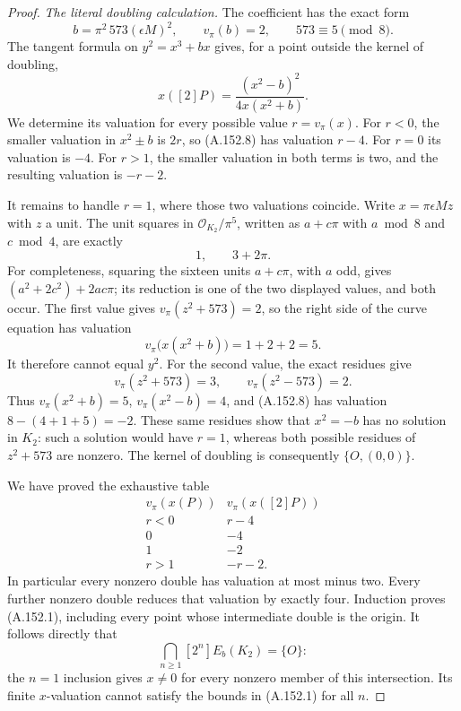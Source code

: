 \begin{proof}
\emph{The literal doubling calculation.}
The coefficient has the exact form
\[
             b=\pi^2\,573(\epsilon M)^2,
             \qquad v_\pi(b)=2,\qquad 573\equiv5\pmod8.
\tag{A.152.7}
\]
The tangent formula on \(y^2=x^3+bx\) gives, for a point
outside the kernel of doubling,
\[
                   x([2]P)=\frac{(x^2-b)^2}{4x(x^2+b)}.
\tag{A.152.8}
\]
We determine its valuation for every possible value
\(r=v_\pi(x)\).
For \(r<0\), the smaller valuation in \(x^2\pm b\)
is \(2r\), so (A.152.8) has valuation \(r-4\).
For \(r=0\) its valuation is \(-4\).
For \(r>1\), the smaller valuation in both terms is two,
and the resulting valuation is \(-r-2\).

It remains to handle \(r=1\), where those two valuations
coincide.  Write \(x=\pi\epsilon Mz\) with \(z\) a unit.
The unit squares in
\(\mathcal O_{K_2}/\pi^5\), written as
\(a+c\pi\) with \(a\bmod8\) and \(c\bmod4\), are
exactly
\[
                                1,\qquad3+2\pi.
\tag{A.152.9}
\]
For completeness, squaring the sixteen units
\(a+c\pi\), with \(a\) odd, gives
\((a^2+2c^2)+2ac\pi\); its reduction is one of the two
displayed values, and both occur.
The first value gives
\(v_\pi(z^2+573)=2\), so the right side of the curve
equation has valuation
\[
              v_\pi\bigl(x(x^2+b)\bigr)=1+2+2=5.
\]
It therefore cannot equal \(y^2\).
For the second value, the exact residues give
\[
             v_\pi(z^2+573)=3,\qquad
             v_\pi(z^2-573)=2.
\tag{A.152.10}
\]
Thus \(v_\pi(x^2+b)=5\), \(v_\pi(x^2-b)=4\),
and (A.152.8) has valuation \(8-(4+1+5)=-2\).
These same residues show that \(x^2=-b\) has no solution
in \(K_2\): such a solution would have \(r=1\), whereas
both possible residues of \(z^2+573\) are nonzero.
The kernel of doubling is consequently \(\{O,(0,0)\}\).

We have proved the exhaustive table
\[
 \begin{array}{c|c}
 v_\pi(x(P))&v_\pi(x([2]P))\\\hline
 r<0&r-4\\
 0&-4\\
 1&-2\\
 r>1&-r-2.
 \end{array}
\tag{A.152.11}
\]
In particular every nonzero double has valuation at most
minus two.  Every further nonzero double reduces that
valuation by exactly four.  Induction proves (A.152.1),
including every point whose intermediate double is the origin.
It follows directly that
\[
                        \bigcap_{n\geq1}[2^n]E_b(K_2)=\{O\}:
\tag{A.152.12}
\]
the \(n=1\) inclusion gives \(x\ne0\) for every nonzero
member of this intersection.  Its finite \(x\)-valuation
cannot satisfy the bounds in (A.152.1) for all \(n\).


\end{proof}

